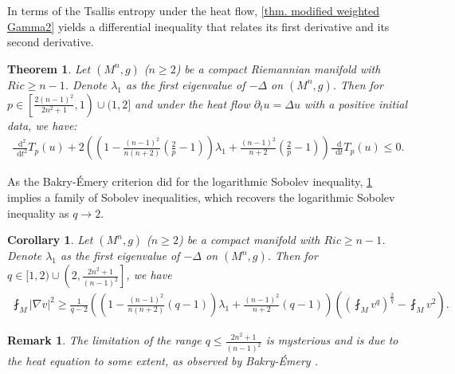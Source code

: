 \documentclass[11pt]{amsart}
\newtheorem{theorem}{Theorem}
\newtheorem{corollary}{Corollary}
\newtheorem{remark}{Remark}
\numberwithin{equation}{section}
\numberwithin{lemma}{section}
\numberwithin{proposition}{section}
\numberwithin{corollary}{section}
\numberwithin{remark}{section}
\newcommand{\dd}{\mathop{}\!\mathrm{d}}%
\begin{document}
In terms of the Tsallis entropy under the heat flow, \cref{thm. modified weighted Gamma2} yields a differential inequality that relates its first derivative and its second derivative.
\begin{theorem}\label{thm. ODE of T entropy}
    Let $(M^n,g)$ ($n\geq 2$) be a compact Riemannian manifold with  $Ric\geq n-1$.
    Denote $\lambda_1$ as the first eigenvalue of $-\Delta $ on $(M^n,g)$.
    Then for $p\in\left[\frac{2(n-1)^2}{2n^2+1},1\right)\cup(1,2]$ and under the heat flow $\partial_t u=\Delta u$ with a positive initial data,  we have:
    \begin{align}\label{ineq. in thm ODE of T entropy}
        \frac{\dd^2}{\dd t^2}T_p(u)
        +2\left(\left(
        1-\frac{(n-1)^2}{n(n+2)}\left(\frac{2}{p}-1\right)
        \right)\lambda_1
        +\frac{(n-1)^2}{n+2}\left(\frac{2}{p}-1\right)
        \right)
        \frac{\dd}{\dd t}T_p(u)
        \leq 0.
    \end{align}
\end{theorem}
As the Bakry-\'Emery criterion did for the logarithmic Sobolev inequality, \cref{thm. ODE of T entropy} implies a family of Sobolev inequalities, which recovers the logarithmic Sobolev inequality as $q\to 2$. 
\begin{corollary}\label{cor. some Sobolev inequalities}
Let $(M^n,g)$ ($n\geq 2$) be a compact manifold with $Ric\geq n-1$. 
Denote $\lambda_1$ as the first eigenvalue of $-\Delta $ on $(M^n,g)$.
Then for $q\in[1,2)\cup\left(2,\frac{2n^2+1}{(n-1)^2}\right]$, we have
    \begin{align*}
        \fint_M|\nabla v|^2
        \geq
        \frac{1}{q-2}
        \left(\left(
        1-\frac{(n-1)^2}{n(n+2)}(q-1)
        \right)\lambda_1
        +\frac{(n-1)^2}{n+2}(q-1)
        \right)
        \left(
        \left(\fint_M v^q\right)^{\frac{2}{q}}
        -\fint_M v^2
        \right).
    \end{align*}
\end{corollary}
\begin{remark}\label{rmk. limitation of q}
    The limitation of the range $q\leq \frac{2n^2+1}{(n-1)^2}$ is mysterious and is due to the heat equation to some extent, as observed by Bakry-\'Emery \cite{BE85}.
\end{remark}
\end{document}
